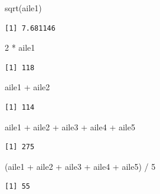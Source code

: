 \documentclass[
  a4paper,
  DIV=11,
  numbers=noendperiod,
  oneside]{scrreprt}
\newenvironment{Shaded}{}{}
\newcommand{\DecValTok}[1]{\textcolor[rgb]{0.00,0.36,0.77}{#1}}
\newcommand{\FunctionTok}[1]{\textcolor[rgb]{0.44,0.26,0.76}{#1}}
\newcommand{\NormalTok}[1]{\textcolor[rgb]{0.14,0.16,0.18}{#1}}
\newcommand{\SpecialCharTok}[1]{\textcolor[rgb]{0.00,0.36,0.77}{#1}}
\begin{document}
\begin{Shaded}
\begin{Highlighting}[]
\FunctionTok{sqrt}\NormalTok{(aile1)}
\end{Highlighting}
\end{Shaded}

\begin{verbatim}
[1] 7.681146
\end{verbatim}

\begin{Shaded}
\begin{Highlighting}[]
\DecValTok{2} \SpecialCharTok{*}\NormalTok{ aile1}
\end{Highlighting}
\end{Shaded}

\begin{verbatim}
[1] 118
\end{verbatim}

\begin{Shaded}
\begin{Highlighting}[]
\NormalTok{aile1 }\SpecialCharTok{+}\NormalTok{ aile2}
\end{Highlighting}
\end{Shaded}

\begin{verbatim}
[1] 114
\end{verbatim}

\begin{Shaded}
\begin{Highlighting}[]
\NormalTok{aile1 }\SpecialCharTok{+}\NormalTok{ aile2 }\SpecialCharTok{+}\NormalTok{ aile3 }\SpecialCharTok{+}\NormalTok{ aile4 }\SpecialCharTok{+}\NormalTok{ aile5}
\end{Highlighting}
\end{Shaded}

\begin{verbatim}
[1] 275
\end{verbatim}

\begin{Shaded}
\begin{Highlighting}[]
\NormalTok{(aile1 }\SpecialCharTok{+}\NormalTok{ aile2 }\SpecialCharTok{+}\NormalTok{ aile3 }\SpecialCharTok{+}\NormalTok{ aile4 }\SpecialCharTok{+}\NormalTok{ aile5) }\SpecialCharTok{/} \DecValTok{5}
\end{Highlighting}
\end{Shaded}

\begin{verbatim}
[1] 55
\end{verbatim}
\end{document}
